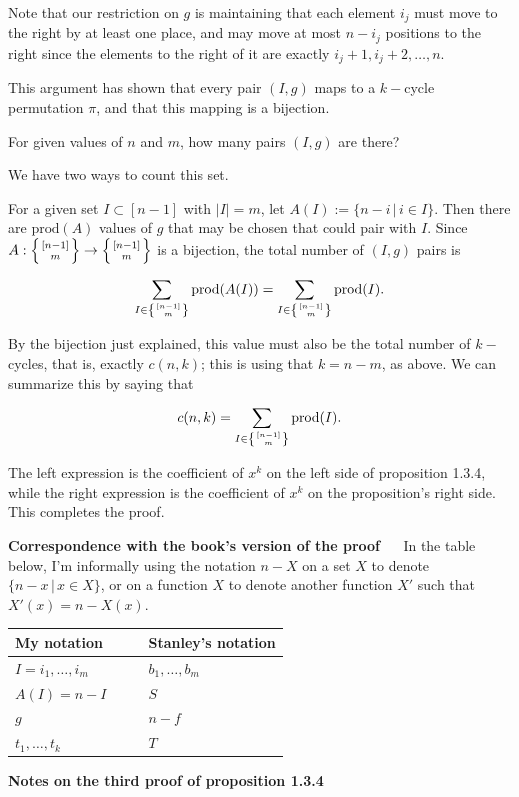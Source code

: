 \documentclass[]{article}
\begin{document}
Note that our restriction on \(g\) is maintaining that each element
\(i_j\) must move to the right by at least one place, and may move at
most \(n-i_j\) positions to the right since the elements to the right of
it are exactly \(i_j + 1, i_j + 2, \ldots, n\).

This argument has shown that every pair \((I, g)\) maps to a \(k-\)cycle
permutation \(\pi\), and that this mapping is a bijection.

For given values of \(n\) and \(m\), how many pairs \((I, g)\) are
there?

We have two ways to count this set.

For a given set \(I\subset [n-1]\) with \(|I| = m\), let
\(A(I):=\{n - i \, | \, i \in I\}\). Then there are \(\text{prod}(A)\)
values of \(g\) that may be chosen that could pair with \(I\). Since
\(A: \left\{{[n-1]\atop m}\right\} \to \left\{{[n-1]\atop m}\right\}\)
is a bijection, the total number of \((I, g)\) pairs is

\[\sum_{I \in \left\{{[n-1]\atop m}\right\}} \text{prod}(A(I)) =
  \sum_{I \in \left\{{[n-1]\atop m}\right\}} \text{prod}(I).\]

By the bijection just explained, this value must also be the total
number of \(k-\)cycles, that is, exactly \(c(n, k)\); this is using that
\(k=n-m\), as above. We can summarize this by saying that

\[c(n, k) = \sum_{I \in \left\{{[n-1]\atop m}\right\}} \text{prod}(I).\]

The left expression is the coefficient of \(x^k\) on the left side of
proposition 1.3.4, while the right expression is the coefficient of
\(x^k\) on the proposition's right side. This completes the proof.

\textbf{Correspondence with the book's version of the proof} \(\quad\)
In the table below, I'm informally using the notation \(n-X\) on a set
\(X\) to denote \(\{n-x \,|\, x\in X\}\), or on a function \(X\) to
denote another function \(X'\) such that \(X'(x) = n - X(x)\).

\begin{longtable}[]{@{}lll@{}}
\toprule
My notation & \(\quad\) & Stanley's notation\tabularnewline
\midrule
\endhead
\(I = i_1, \ldots, i_m\) & & \(b_1, \ldots, b_m\)\tabularnewline
\(A(I) = n - I\) & & \(S\)\tabularnewline
\(g\) & & \(n - f\)\tabularnewline
\(t_1, \ldots, t_k\) & & \(T\)\tabularnewline
\bottomrule
\end{longtable}

\textbf{Notes on the third proof of proposition 1.3.4}
\end{document}
